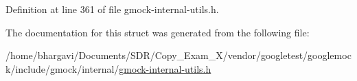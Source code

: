 Definition at line 361 of file gmock-\/internal-\/utils.\+h.



The documentation for this struct was generated from the following file\+:\begin{DoxyCompactItemize}
\item 
/home/bhargavi/\+Documents/\+S\+D\+R/\+Copy\+\_\+\+Exam\+\_\+X/vendor/googletest/googlemock/include/gmock/internal/\hyperlink{gmock-internal-utils_8h}{gmock-\/internal-\/utils.\+h}\end{DoxyCompactItemize}
